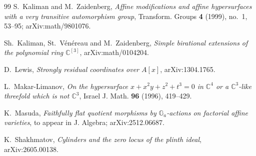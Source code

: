 \documentclass[11pt]{article}
\theoremstyle{definition}
\theoremstyle{remark}
\newcommand{\C}{\mathbb{C}}
\newcommand{\Ga}{\mathbb{G}_a}
\begin{document}
\begin{thebibliography}{99}
S.~Kaliman and M.~Zaidenberg, \emph{Affine modifications and affine
hypersurfaces with a very transitive automorphism group}, Transform. Groups
\textbf{4} (1999), no.~1, 53--95; arXiv:math/9801076.

Sh.~Kaliman, St.~V\'en\'ereau and M.~Zaidenberg, \emph{Simple birational
extensions of the polynomial ring $\C^{[3]}$}, arXiv:math/0104204.

D.~Lewis, \emph{Strongly residual coordinates over $A[x]$}, arXiv:1304.1765.

L.~Makar-Limanov, \emph{On the hypersurface $x+x^2y+z^2+t^3=0$ in $\C^4$ or a
$\C^3$-like threefold which is not $\C^3$}, Israel J. Math. \textbf{96}
(1996), 419--429.

K.~Masuda, \emph{Faithfully flat quotient morphisms by $\Ga$-actions on
factorial affine varieties}, to appear in J. Algebra; arXiv:2512.06687.

K.~Shakhmatov, \emph{Cylinders and the zero locus of the plinth ideal},
arXiv:2605.00138.

\end{thebibliography}
\end{document}

